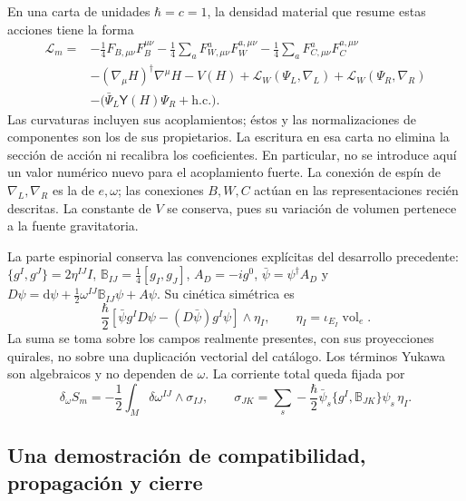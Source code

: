 En una carta de unidades \(\hbar=c=1\), la densidad material que resume
estas acciones tiene la forma
\begin{equation}
 \begin{split}
 \mathcal L_m={}&-\frac14 F_{B,\mu\nu}F_B^{\mu\nu}
 -\frac14\sum_a F_{W,\mu\nu}^aF_W^{a,\mu\nu}
 -\frac14\sum_a F_{C,\mu\nu}^aF_C^{a,\mu\nu}\\
 &-(\nabla_\mu H)^\dagger\nabla^\mu H-V(H)
 +\mathcal L_W(\Psi_L,\nabla_L)+\mathcal L_W(\Psi_R,\nabla_R)\\
 &-\bigl(\bar\Psi_L\mathsf Y(H)\Psi_R+\mathrm{h.c.}\bigr).
 \end{split}
 \label{hmtcuatro:densidad-material}
\end{equation}
Las curvaturas incluyen sus acoplamientos; éstos y las normalizaciones
de componentes son los de sus propietarios. La escritura en esa carta
no elimina la sección de acción ni recalibra los coeficientes.
En particular, no se introduce aquí un valor numérico nuevo para el
acoplamiento fuerte. La conexión de espín de \(\nabla_L,\nabla_R\)
es la de \(e,\omega\); las conexiones \(B,W,C\) actúan en las
representaciones recién descritas. La constante de \(V\) se conserva,
pues su variación de volumen pertenece a la fuente gravitatoria.

La parte espinorial conserva las convenciones explícitas del desarrollo
precedente: \(\{g^I,g^J\}=2\eta^{IJ}I\),
\(\mathbb B_{IJ}=\frac14[g_I,g_J]\), \(A_D=-ig^0\),
\(\bar\psi=\psi^\dagger A_D\) y
\(D\psi=\mathrm d\psi+\frac12\omega^{IJ}\mathbb B_{IJ}\psi+A\psi\).
Su cinética simétrica es
\[
 \frac{\hbar}{2}
 [\bar\psi g^I D\psi-(D\bar\psi)g^I\psi]\wedge\eta_I,
 \qquad \eta_I=\iota_{E_I}\operatorname{vol}_e .
\]
La suma se toma sobre los campos realmente presentes, con sus
proyecciones quirales, no sobre una duplicación vectorial del catálogo.
Los términos Yukawa son algebraicos y no dependen de \(\omega\).
La corriente total queda fijada por
\begin{equation}
 \delta_\omega S_m=-\frac12\int_M\delta\omega^{IJ}\wedge\sigma_{IJ},
 \qquad
 \sigma_{JK}=\sum_s-\frac{\hbar}{2}
   \bar\psi_s\{g^I,\mathbb B_{JK}\}\psi_s\,\eta_I.
 \label{hmtcuatro:corriente-total}
\end{equation}

\subsection{Una demostración de compatibilidad, propagación y cierre}
\label{hmtcuatro:demostracion-unica}

